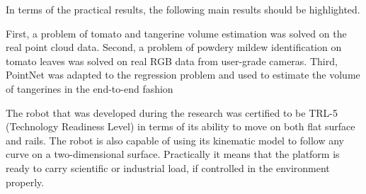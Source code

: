 


In terms of the practical results, the following main results should be highlighted.

First, a problem of tomato and tangerine volume estimation was solved on the real point cloud data.
Second, a problem of powdery mildew identification on tomato leaves was solved on real RGB data from user-grade cameras.
Third, PointNet was adapted to the regression problem and used to estimate the volume of tangerines in the end-to-end fashion

The robot that was developed during the research was certified to be TRL-5 (Technology Readiness Level) in terms of its ability to move on both flat surface and rails.
The robot is also capable of using its kinematic model to follow any curve on a two-dimensional surface.
Practically it means that the platform is ready to carry scientific or industrial load, if controlled in the environment properly.

